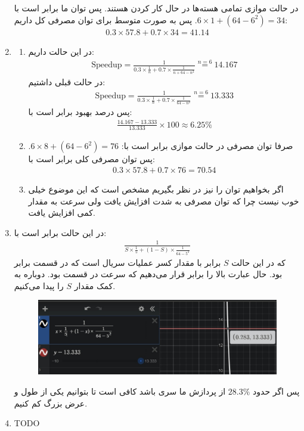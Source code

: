 \begin{enumerate}
    در حالت موازی تمامی هسته‌ها در حال کار کردن هستند. پس توان ما برابر است با
    $6 \times 1 + (64 - 6^2) = 34$.
    پس به صورت متوسط برای توان مصرفی کل داریم:
    \begin{gather*}
        0.3 \times 57.8 + 0.7 \times 34 = 41.14
    \end{gather*}
    \item \begin{enumerate}
        \item در این حالت داریم:
        \begin{gather*}
            \text{Speedup} = \frac{1}{0.3 \times \frac{1}{n} + 0.7 \times \frac{1}{n + 64 - n^2}} \stackrel{n = 6}{=} 14.167
        \end{gather*}
        در حالت قبلی داشتیم:
        \begin{gather*}
            \text{Speedup} = \frac{1}{0.3 \times \frac{1}{n} + 0.7 \times \frac{1}{64 - n^2}} \stackrel{n = 6}{=} 13.333
        \end{gather*}
        پس درصد بهبود برابر است با:
        \begin{gather*}
            \frac{14.167 - 13.333}{13.333} \times 100 \approx 6.25 \%
        \end{gather*}
        \item صرفا توان مصرفی در حالت موازی برابر است با:
        $6 \times 8 + (64 - 6^2) = 76$.
        پس توان مصرفی کلی برابر است با:
        \begin{gather*}
            0.3 \times 57.8 + 0.7 \times 76 = 70.54
        \end{gather*}
        \item اگر بخواهیم توان را نیز در نظر بگیریم مشخص است که این موضوع خیلی خوب نیست چرا که توان مصرفی به شدت
        افزایش یافت ولی سرعت به مقدار کمی افزایش یافت.
    \end{enumerate}
    \item در این حالت  برابر است با:
    \begin{gather*}
        \frac{1}{S \times \frac{1}{5} + (1 - S) \times \frac{1}{64 - 5^2}}
    \end{gather*}
    که در این حالت $S$ برابر با مقدار کسر عملیات سریال است که در قسمت  برابر  بود.
    حال عبارت بالا را برابر
    قرار می‌دهیم که سرعت در قسمت
    بود. دوباره به کمک
    مقدار
    $S$
    را پیدا می‌کنیم.
    \begin{figure}[H]
        \centerline{\includegraphics[scale=0.5]{pics/1-4.jpg}}
    \end{figure}
    پس اگر حدود
    $28.3\%$
    از پردازش ما سری باشد کافی است تا بتوانیم یکی از طول و عرض
    بزرگ کم کنیم.
    \item TODO
\end{enumerate}









